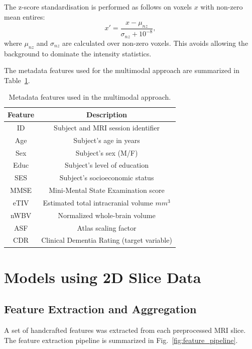 \documentclass[10pt,twocolumn]{article}
\begin{document}
        \noindent
        The z-score standardisation is performed as follows on voxels $x$ with non-zero mean entires:
        \begin{equation}
            x' = \frac{x-\mu_{nz}}{\sigma_{nz}+10^{-8}},
        \end{equation}
        where $\mu_{nz}$ and $\sigma_{nz}$ are calculated over non-zero voxels. This avoids allowing the background to dominate the intensity statistics.

        \noindent
        The metadata features used for the multimodal approach are summarized in Table~\ref{tab:metadata_features}.
        \begin{table}[htbp]
            \centering
            \begin{tabular}{c|c}
            \toprule
            Feature & Description \\
            \midrule
                ID & Subject and MRI session identifier \\
                Age & Subject's age in years \\
                Sex & Subject's sex (M/F) \\
                Educ & Subject's level of education \\
                SES & Subject's socioeconomic status \\
                MMSE & Mini-Mental State Examination score \\
                eTIV & Estimated total intracranial volume $mm^3$ \\
                nWBV & Normalized whole-brain volume \\
                ASF & Atlas scaling factor \\
                CDR & Clinical Dementia Rating (target variable) \\
            \bottomrule
            \end{tabular}
            \caption{Metadata features used in the multimodal approach.}
            \label{tab:metadata_features}
        \end{table}

\section{Models using 2D Slice Data}
        \subsection{Feature Extraction and Aggregation}
            A set of handcrafted features was extracted from each preprocessed MRI
            slice. The feature extraction pipeline is summarized in Fig.~\ref{fig:feature_pipeline}.
\end{document}

